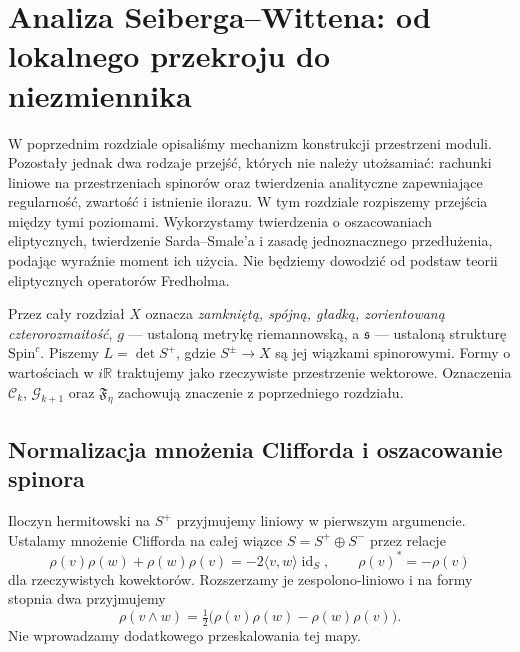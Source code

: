 \chapter{Analiza Seiberga--Wittena: od lokalnego przekroju do niezmiennika}
\label{ch:tg-sw-analiza-uzup}

W poprzednim rozdziale opisaliśmy mechanizm konstrukcji przestrzeni moduli.
Pozostały jednak dwa rodzaje przejść, których nie należy utożsamiać:
rachunki liniowe na przestrzeniach spinorów oraz twierdzenia analityczne
zapewniające regularność, zwartość i istnienie ilorazu. W tym rozdziale
rozpiszemy przejścia między tymi poziomami. Wykorzystamy twierdzenia
o oszacowaniach eliptycznych, twierdzenie Sarda--Smale'a i zasadę
jednoznacznego przedłużenia, podając wyraźnie moment ich użycia.
Nie będziemy dowodzić od podstaw teorii eliptycznych operatorów Fredholma.

Przez cały rozdział $X$ oznacza \emph{zamkniętą, spójną, gładką,
zorientowaną czterorozmaitość}, $g$ --- ustaloną metrykę riemannowską,
a $\mathfrak s$ --- ustaloną strukturę $\mathrm{Spin}^c$.
Piszemy $L=\det S^+$, gdzie $S^\pm\to X$ są jej wiązkami spinorowymi.
Formy o wartościach w $i\mathbb R$ traktujemy jako rzeczywiste
przestrzenie wektorowe. Oznaczenia $\mathcal C_k$, $\mathcal G_{k+1}$
oraz $\mathfrak F_\eta$ zachowują znaczenie z poprzedniego rozdziału.

\section{Normalizacja mnożenia Clifforda i oszacowanie spinora}
\label{sec:tg-sw12-clifford}

Iloczyn hermitowski na $S^+$ przyjmujemy liniowy w pierwszym
argumencie. Ustalamy mnożenie Clifforda na całej wiązce
$S=S^+\oplus S^-$ przez relacje
\[
\rho(v)\rho(w)+\rho(w)\rho(v)=-2\langle v,w\rangle
\operatorname{id}_S,\qquad \rho(v)^*=-\rho(v)
\]
dla rzeczywistych kowektorów. Rozszerzamy je zespolono-liniowo
i na formy stopnia dwa przyjmujemy
\[
\rho(v\wedge w)=\tfrac12
\bigl(\rho(v)\rho(w)-\rho(w)\rho(v)\bigr).
\]
Nie wprowadzamy dodatkowego przeskalowania tej mapy.

